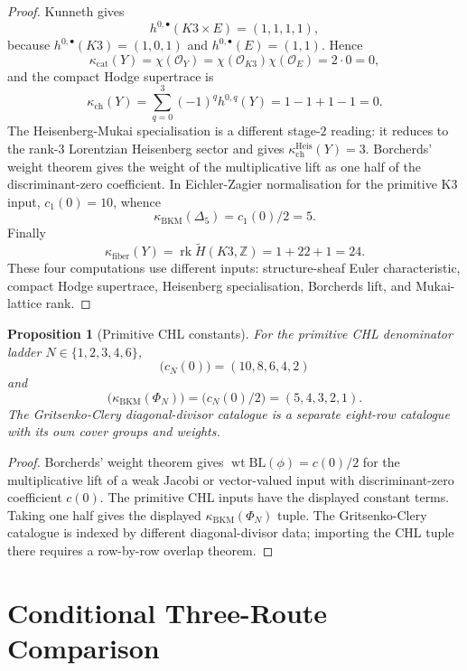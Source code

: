 \documentclass[11pt]{article}
\newtheorem{proposition}[theorem]{Proposition}
\providecommand{\ZZ}{\mathbb{Z}}
\providecommand{\cO}{\mathcal{O}}
\begin{document}
\begin{proof}
Kunneth gives
\[
 h^{0,\bullet}(K3\times E)=(1,1,1,1),
\]
because $h^{0,\bullet}(K3)=(1,0,1)$ and $h^{0,\bullet}(E)=(1,1)$.
Hence
\[
 \kappa_{\mathrm{cat}}(Y)
 =
 \chi(\cO_Y)
 =
 \chi(\cO_{K3})\chi(\cO_E)
 =
 2\cdot 0
 =
 0,
\]
and the compact Hodge supertrace is
\[
 \kappa_{\mathrm{ch}}(Y)
 =
 \sum_{q=0}^{3}(-1)^q h^{0,q}(Y)
 =
 1-1+1-1
 =
 0.
\]
The Heisenberg-Mukai specialisation is a different stage-$2$ reading:
it reduces to the rank-$3$ Lorentzian Heisenberg sector and gives
$\kappa_{\mathrm{ch}}^{\mathrm{Heis}}(Y)=3$. Borcherds' weight theorem
gives the weight of the multiplicative lift as one half of the
discriminant-zero coefficient. In Eichler-Zagier normalisation for the
primitive K3 input, $c_1(0)=10$, whence
\[
 \kappa_{\mathrm{BKM}}(\Delta_5)=c_1(0)/2=5.
\]
Finally
\[
 \kappa_{\mathrm{fiber}}(Y)
 =
 \operatorname{rk}\widetilde H(K3,\ZZ)
 =
 1+22+1
 =
 24.
\]
These four computations use different inputs: structure-sheaf Euler
characteristic, compact Hodge supertrace, Heisenberg specialisation,
Borcherds lift, and Mukai-lattice rank.
\end{proof}

\begin{proposition}[Primitive CHL constants]
\label{prop:primitive-chl-constants}
For the primitive CHL denominator ladder
$N\in\{1,2,3,4,6\}$,
\[
 \bigl(c_N(0)\bigr)=(10,8,6,4,2)
\]
and
\[
 \bigl(\kappa_{\mathrm{BKM}}(\Phi_N)\bigr)
 =
 \bigl(c_N(0)/2\bigr)
 =
 (5,4,3,2,1).
\]
The Gritsenko-Clery diagonal-divisor catalogue is a separate eight-row
catalogue with its own cover groups and weights.
\end{proposition}

\begin{proof}
Borcherds' weight theorem gives
$\operatorname{wt}\mathrm{BL}(\phi)=c(0)/2$ for the multiplicative
lift of a weak Jacobi or vector-valued input with discriminant-zero
coefficient $c(0)$. The primitive CHL inputs have the displayed
constant terms. Taking one half gives the displayed
$\kappa_{\mathrm{BKM}}(\Phi_N)$ tuple. The Gritsenko-Clery catalogue is
indexed by different diagonal-divisor data; importing the CHL tuple
there requires a row-by-row overlap theorem.
\end{proof}

\section{Conditional Three-Route Comparison}
\label{sec:conditional-comparison}
\end{document}
